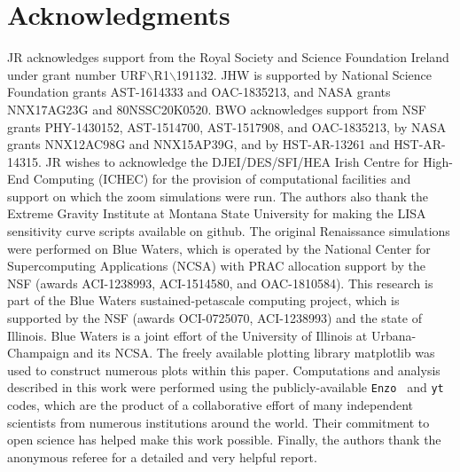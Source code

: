 \documentclass[twocolumn,iop,revtex4]{openjournal}
\newcommand{\enzo}{\texttt{Enzo~}}
\newcommand{\yt}{\texttt{yt~}}
\begin{document}
\section*{Acknowledgments}

\noindent JR acknowledges support from the Royal Society and Science Foundation Ireland under
grant number URF$\backslash$R1$\backslash$191132.
JHW is supported by National Science Foundation grants AST-1614333 and
OAC-1835213, and NASA grants NNX17AG23G and 80NSSC20K0520.  
BWO acknowledges support from NSF grants PHY-1430152, AST-1514700, AST-1517908, and  OAC-1835213, by NASA grants NNX12AC98G and NNX15AP39G, and by HST-AR-13261 and HST-AR-14315.
JR wishes to acknowledge the DJEI/DES/SFI/HEA Irish Centre for High-End Computing (ICHEC) for the
provision of computational facilities and support on which the zoom simulations were run.
The authors also thank the Extreme Gravity Institute at Montana State University for making the
LISA sensitivity curve scripts available on github. 
The original Renaissance simulations were performed on Blue 
Waters, which is operated by the National Center for Supercomputing Applications (NCSA)
with PRAC allocation support by the NSF (awards ACI-1238993, ACI-1514580, and OAC-1810584).
This research is part of the Blue Waters sustained-petascale computing project, which
is supported by the NSF (awards OCI-0725070, ACI-1238993) and the state of
Illinois. Blue Waters is a joint effort of the University of Illinois at
Urbana-Champaign and its NCSA.  The freely available plotting library {\sc
matplotlib} \citep{matplotlib} was used to construct numerous plots within this
paper. Computations and analysis described in this work were performed using the
publicly-available \enzo{}\citep{Enzo_2014, Enzo_2019} and \yt{} \citep{YT} codes,
which are the product of a collaborative effort of many independent scientists
from numerous institutions around the world. Their commitment to open science
has helped make this work possible. Finally, the authors thank the anonymous referee
for a detailed and very helpful report. 


\label{lastpage}


\end{document}
